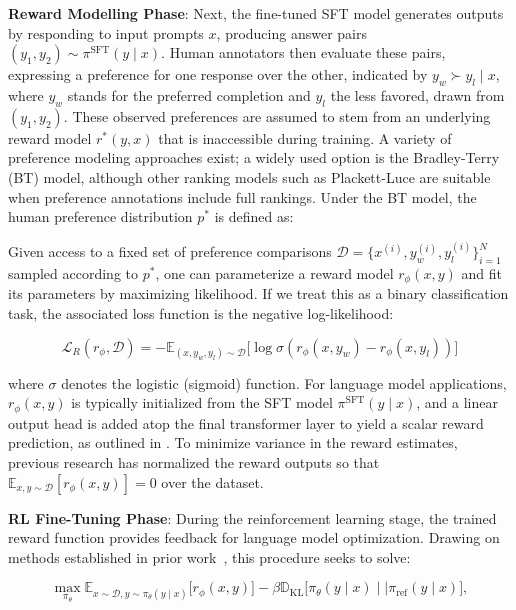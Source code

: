 \textbf{Reward Modelling Phase}: Next, the fine-tuned SFT model generates outputs by responding to input prompts $x$, producing answer pairs $(y_1, y_2)\sim \pi^\text{SFT}(y \mid x)$. Human annotators then evaluate these pairs, expressing a preference for one response over the other, indicated by $y_w\succ y_l \mid x$, where $y_w$ stands for the preferred completion and $y_l$ the less favored, drawn from $(y_1, y_2)$. These observed preferences are assumed to stem from an underlying reward model $r^*(y, x)$ that is inaccessible during training. A variety of preference modeling approaches exist; a widely used option is the Bradley-Terry (BT) \cite{bradley1952rankanalysis} model, although other ranking models such as Plackett-Luce \citep{plackett1975analysis, luce2012individual} are suitable when preference annotations include full rankings. Under the BT model, the human preference distribution $p^*$ is defined as:

Given access to a fixed set of preference comparisons $\mathcal{D}=\bigl\{x^{(i)}, y_w^{(i)}, y_l^{(i)}\bigr\}_{i=1}^N$ sampled according to $p^*$, one can parameterize a reward model $r_{\phi}(x, y)$ and fit its parameters by maximizing likelihood. If we treat this as a binary classification task, the associated loss function is the negative log-likelihood:

\begin{equation}\label{eq:reward_model}
    \mathcal{L}_R(r_{\phi}, \mathcal{D}) = -\mathbb{E}_{(x, y_w, y_l)\sim \mathcal{D}}\bigl[\log \sigma(r_{\phi}(x, y_w)- r_{\phi}(x, y_l))\bigr]
\end{equation}

where $\sigma$ denotes the logistic (sigmoid) function. For language model applications, $r_{\phi}(x, y)$ is typically initialized from the SFT model $\pi^\text{SFT}(y \mid x)$, and a linear output head is added atop the final transformer layer to yield a scalar reward prediction, as outlined in \cite{ziegler2020finetuning}. To minimize variance in the reward estimates, previous research has normalized the reward outputs so that $\mathbb{E}_{x,y\sim \mathcal{D}}\left[r_\phi(x, y)\right] = 0$ over the dataset.

\textbf{RL Fine-Tuning Phase}: During the reinforcement learning stage, the trained reward function provides feedback for language model optimization. Drawing on methods established in prior work~\citep{jaques2017sequence, jaques2020human}, this procedure seeks to solve:

\begin{equation}\label{eq:RL}
\max_{\pi_{\theta}}  \mathbb{E}_{x\sim \mathcal{D}, y\sim \pi_{\theta}(y \mid x)}\bigl[r_{\phi}(x, y)\bigr] - \beta\mathbb{D}_{\textrm{KL}}\bigl[\pi_{\theta}(y\mid x)\mid \mid \pi_\text{ref}(y\mid x)\bigr],
\end{equation}

